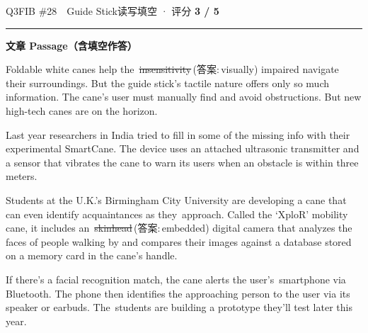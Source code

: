\documentclass[11pt]{article}
\newcommand{\ptesub}[1]{%
  \par\needspace{2\baselineskip}\smallskip
  {\color{cAccent}\rule[-0.2ex]{3pt}{1.05em}}\hspace{6pt}%
  {\bfseries\color{cHead}#1}\par\nopagebreak\smallskip}
\newcommand{\rok}[1]{{\color{cFix}\ding{51}\,#1}}                 %
\newcommand{\rno}[2]{{\color{cWrong}\ding{55}\,\sout{#1}}\,{\footnotesize\color{cFix}(答案:\,#2)}}  %
\begin{document}
\begin{qblock}{Q3\quad FIB \#28\ \ Guide Stick}{读写填空 · 评分 \textcolor{cAccent}{\bfseries 3 / 5}}
\ptesub{文章 Passage（含填空作答）}
\begin{promptbox}
Foldable white canes help the \rno{insensitivity}{visually} impaired navigate their surroundings. But the guide stick's tactile nature offers only so much information. The cane's user must manually find and avoid obstructions. But new high-tech canes are on the horizon.

Last year researchers in India tried to fill in some of the missing info with their experimental SmartCane. The device uses an attached ultrasonic transmitter and a sensor that vibrates the cane to warn its users when an obstacle is within three meters.

Students at the U.K.'s Birmingham City University are developing a cane that can even identify acquaintances as they \rok{approach}. Called the `XploR' mobility cane, it includes an \rno{skinhead}{embedded} digital camera that analyzes the faces of people walking by and compares their images against a database stored on a memory card in the cane's handle.

If there's a facial recognition match, the cane alerts the user's \rok{smartphone} via Bluetooth. The phone then identifies the approaching person to the user via its speaker or earbuds. The \rok{students} are building a prototype they'll test later this year.


\end{promptbox}
\end{qblock}
\end{document}
